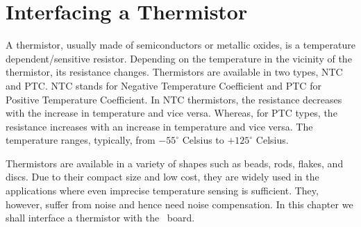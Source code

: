 \chapter {Interfacing a Thermistor}
\thispagestyle{empty}
\label{thermistor}

\newcommand{\LocTHERMfig}{\Origin/user-code/thermistor/figures}
\newcommand{\LocTHERMscicode}{\Origin/user-code/thermistor/scilab}
\newcommand{\LocTHERMscibrief}[1]{{\tt \seqsplit{%
        Origin/user-code/thermistor/scilab/#1}}, see \fnrefp{fn:file-loc}}
\newcommand{\LocTHERMardcode}{\Origin/user-code/thermistor/arduino}
\newcommand{\LocTHERMardbrief}[1]{{\tt \seqsplit{%
        Origin/user-code/thermistor/arduino/#1}}, see \fnrefp{fn:file-loc}}

\newcommand{\LocTHERMpycode}{\Origin/user-code/thermistor/python}
\newcommand{\LocTHERMpybrief}[1]{{\tt \seqsplit{%
        Origin/user-code/thermistor/python/#1}}, see \fnrefp{fn:file-loc}}

\newcommand{\LocTHERMjuliacode}{\Origin/user-code/thermistor/julia}
\newcommand{\LocTHERMjuliabrief}[1]{{\tt \seqsplit{%
        Origin/user-code/thermistor/julia/#1}}, see \fnrefp{fn:file-loc}}

\newcommand{\LocTHERMOpenModelicacode}{\Origin/user-code/thermistor/OpenModelica}
\newcommand{\LocTHERMOpenModelicabrief}[1]{{\tt \seqsplit{%
        Origin/user-code/thermistor/OpenModelica/#1}}, see \fnrefp{fn:file-loc}}

A thermistor, usually made of semiconductors or metallic oxides, is a
temperature dependent/sensitive resistor. Depending on the temperature
in the vicinity of the thermistor, its resistance changes. Thermistors
are available in two types, NTC and PTC. NTC stands for Negative
Temperature Coefficient and PTC for Positive Temperature
Coefficient. In NTC thermistors, the resistance decreases with the
increase in temperature and vice versa. Whereas, for PTC types, the
resistance increases with an increase in temperature and vice
versa. The temperature ranges, typically, from $-55^{\circ}$ Celsius
to $+125^{\circ}$ Celsius.

Thermistors are available in a variety of shapes such as beads, rods,
flakes, and discs. Due to their compact size and low cost, they are
widely used in the applications where even imprecise temperature
sensing is sufficient. They, however, suffer from noise and hence need
noise compensation. In this chapter we shall interface a thermistor
with the \arduino\ board.


